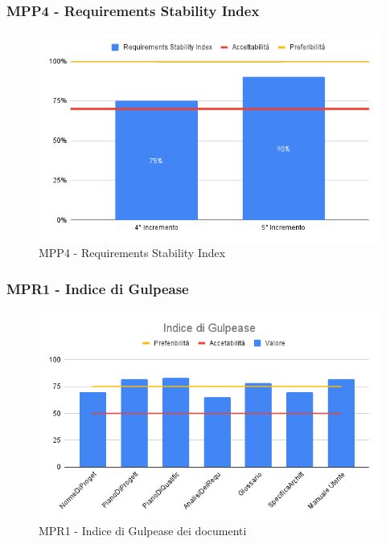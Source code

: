 \subsubsection{MPP4 - Requirements Stability Index}

\begin{figure}[H]
	\centering
	\includegraphics[scale = 0.6]{sezioni/Images/PB/RequirementsStabilityIndex.png}
	\caption{MPP4 - Requirements Stability Index}
\end{figure}

\subsubsection{MPR1 - Indice di Gulpease}

\begin{figure}[H]
	\centering
	\includegraphics[scale = 0.6]{sezioni/Images/PB/GulpeaseGenerale.png}
	\caption{MPR1 - Indice di Gulpease dei documenti}
\end{figure}

